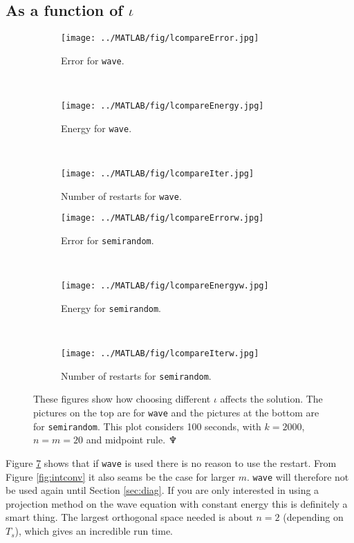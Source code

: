 \subsection{As a function of $\iota$}%
\begin{figure}[H]
        \centering
        \begin{subfigure}[b]{0.30\textwidth}
                \texttt{[image: ../MATLAB/fig/lcompareError.jpg]}
                \caption{ Error for \texttt{wave}. }
                \label{fig:lcompareError}
        \end{subfigure}
		~
        \begin{subfigure}[b]{0.30\textwidth}
                \texttt{[image: ../MATLAB/fig/lcompareEnergy.jpg]}
                \caption{ Energy for \texttt{wave}. }
                \label{fig:lcompareEnergy}
        \end{subfigure}
        ~
		\begin{subfigure}[b]{0.30\textwidth}
                \texttt{[image: ../MATLAB/fig/lcompareIter.jpg]}
                \caption{ Number of restarts for \texttt{wave}. }
                \label{fig:lcompareIter}
        \end{subfigure}
        
		\begin{subfigure}[b]{0.30\textwidth}
                \texttt{[image: ../MATLAB/fig/lcompareErrorw.jpg]}
                \caption{ Error for \texttt{semirandom}. }
                \label{fig:lcompareErrorw}
        \end{subfigure}
		~
		\begin{subfigure}[b]{0.30\textwidth}
                \texttt{[image: ../MATLAB/fig/lcompareEnergyw.jpg]}
                \caption{ Energy for \texttt{semirandom}. }
                \label{fig:lcompareEnergyw}
        \end{subfigure}
		~
		\begin{subfigure}[b]{0.30\textwidth}
                \texttt{[image: ../MATLAB/fig/lcompareIterw.jpg]}
                \caption{ Number of restarts for \texttt{semirandom}. }
                \label{fig:lcompareIterw}
        \end{subfigure}
        \caption{ These figures show how choosing different $\iota$ affects the solution. The pictures on the top are for \texttt{wave} and the pictures at the bottom are for \texttt{semirandom}. This plot considers 100 seconds, with $k = 2000$, $n = m = 20$ and midpoint rule. \hfill $\neptune$  }
        \label{fig:lcompare}
\end{figure}
Figure \ref{fig:lcompare} shows that if \texttt{wave} is used there is no reason to use the restart. From Figure \ref{fig:intconv} it also seams be the case for larger $m$. \texttt{wave} will therefore not be used again until Section \ref{sec:diag}. If you are only interested in using a projection method on the wave equation with constant energy this is definitely a smart thing. The largest orthogonal space needed is about $n=2$ (depending on $T_s$), which gives an incredible run time.\\

